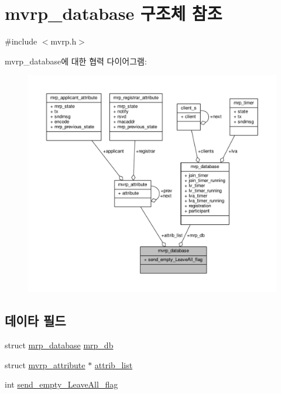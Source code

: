 \hypertarget{structmvrp__database}{}\section{mvrp\+\_\+database 구조체 참조}
\label{structmvrp__database}


{\ttfamily \#include $<$mvrp.\+h$>$}



mvrp\+\_\+database에 대한 협력 다이어그램\+:
\nopagebreak
\begin{figure}[H]
\begin{center}
\leavevmode
\includegraphics[width=350pt]{structmvrp__database__coll__graph}
\end{center}
\end{figure}
\subsection*{데이타 필드}
\begin{DoxyCompactItemize}
\item 
struct \hyperlink{structmrp__database}{mrp\+\_\+database} \hyperlink{structmvrp__database_a7e08db3b85c932325ce3a3605a09ab0c}{mrp\+\_\+db}
\item 
struct \hyperlink{structmvrp__attribute}{mvrp\+\_\+attribute} $\ast$ \hyperlink{structmvrp__database_a463dff8bce0eaaee9897b5190ffc9460}{attrib\+\_\+list}
\item 
int \hyperlink{structmvrp__database_a5c551b6ff3976e96ec18e69b0706a532}{send\+\_\+empty\+\_\+\+Leave\+All\+\_\+flag}
\end{DoxyCompactItemize}


